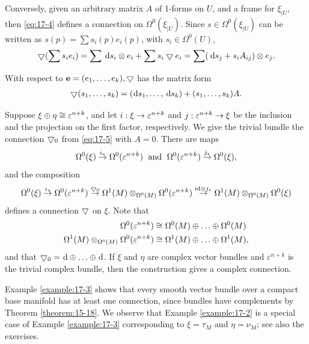 Conversely, given an arbitrary matrix $A$ of 1-forms on $U$, and a frame for ${\xi }_{\mid U}$, then \eqref{eq:17-4} defines 
a connection on $\Omega^0( {\xi }_{\mid U})$. Since $s \in  \Omega^0( {\xi }_{\mid U})$ can be written as $s(p)  = \sum {s}_{i}(p) {e}_{i}(p)$, 
with ${s}_{i} \in  \Omega^0( U)$,
\[
  \btd ( {\sum {s}_{i}{e}_{i}})  
  = \sum \dd{s}_{i} \otimes  {e}_{i} + \sum {s}_{i}\btd {e}_{i} 
  = \sum ( {\dd{s}_{j} + {s}_{i}{A}_{ij}})  \otimes  {e}_{j}.
\]

With respect to $\mathbf{e} = ( {{e}_1,\ldots,{e}_{k}}),\bigtriangledown$ has the matrix form
\begin{align}\label{eq:17-5}
\btd ( {{s}_1,\ldots,{s}_{k}})  = (\!{\dd{s}_1,\ldots,\dd{s}_{k}})  + ( {{s}_1,\ldots,{s}_{k}}) A.
\end{align}

\begin{example}\label{example:17-3}
  Suppose $\xi  \oplus  \eta  \cong  {\varepsilon }^{n + k}$, and 
  let $i:\xi  \rightarrow  {\varepsilon }^{n + k}$ and $j:{\varepsilon }^{n + k} \rightarrow  \xi$ be the inclusion and 
  the projection on the first factor, respectively. We give the trivial bundle the 
  connection $\bigtriangledown_0$ from \eqref{eq:17-5} with $A = 0$. There are maps
  \[
    \Omega^0(\xi) \overset{{i}_{ * }}{ \rightarrow  }\Omega^0( {\varepsilon }^{n + k}) 
    \;\text{ and }\;
    \Omega^0( {\varepsilon }^{n + k}) \overset{{j}_{ * }}{ \rightarrow  }\Omega^0(\xi),
  \]
  and the composition
  \[
    \Omega^0(\xi) \overset{{i}_{ * }}{ \rightarrow  }
    \Omega^0( {\varepsilon }^{n + k}) \overset{\bigtriangledown_0}{ \rightarrow  }
    \Omega^1(M) \otimes_{\Omega^0(M) }\Omega^0( {\varepsilon }^{n + k}) \overset{\mathrm{{id}} \otimes  {j}_{ * }}{ \rightarrow  }
    \Omega^1(M) \otimes_{\Omega^0(M) }\Omega^0(\xi)
  \]
  defines a connection $\bigtriangledown$ on $\xi$. Note that
  \begin{align*}
    \Omega^0( {\varepsilon }^{n + k})  
      & \cong \Omega^0(M)  \oplus  \ldots  \oplus  \Omega^0(M)\\
    \Omega^1(M) \otimes_{\Omega^0(M) }\Omega^0( {\varepsilon }^{n + k})  
      & \cong \Omega^1(M)  \oplus  \ldots  \oplus  \Omega^1(M),
  \end{align*}
  and that $\btd_0 =\dd \oplus \ldots \oplus \dd$. If $\xi$ and $\eta$ are complex vector bundles 
  and ${\varepsilon }^{n + k}$ is the trivial complex bundle, then the construction gives a complex connection.
\end{example}

Example \ref{example:17-3} shows that every smooth vector bundle over a compact base manifold has at least 
one connection, since bundles have complements by Theorem \ref{theorem:15-18}. We observe that Example \ref{example:17-2} 
is a special case of Example \ref{example:17-3} corresponding to $\xi  = {\tau }_{M}$ and $\eta  = {\nu }_{M}$; see 
also the exercises.

